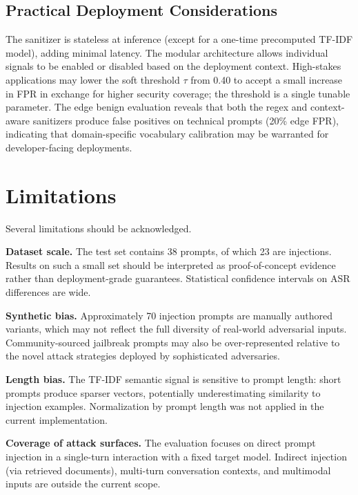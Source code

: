 \documentclass[10pt,conference]{IEEEtran}
\begin{document}
\subsection{Practical Deployment Considerations}

The sanitizer is stateless at inference (except for a one-time
precomputed TF-IDF model), adding minimal latency.
The modular architecture allows individual signals to be enabled or
disabled based on the deployment context.
High-stakes applications may lower the soft threshold $\tau$ from
0.40 to accept a small increase in FPR in exchange for higher
security coverage; the threshold is a single tunable parameter.
The edge benign evaluation reveals that both the regex and
context-aware sanitizers produce false positives on technical prompts
(20\% edge FPR), indicating that domain-specific vocabulary
calibration may be warranted for developer-facing deployments.

\section{Limitations}
\label{sec:limitations}

Several limitations should be acknowledged.

\textbf{Dataset scale.}
The test set contains 38 prompts, of which 23 are injections.
Results on such a small set should be interpreted as proof-of-concept
evidence rather than deployment-grade guarantees.
Statistical confidence intervals on ASR differences are wide.

\textbf{Synthetic bias.}
Approximately 70 injection prompts are manually authored variants,
which may not reflect the full diversity of real-world adversarial
inputs.
Community-sourced jailbreak prompts may also be over-represented
relative to the novel attack strategies deployed by sophisticated
adversaries.

\textbf{Length bias.}
The TF-IDF semantic signal is sensitive to prompt length: short
prompts produce sparser vectors, potentially underestimating
similarity to injection examples.
Normalization by prompt length was not applied in the current
implementation.

\textbf{Coverage of attack surfaces.}
The evaluation focuses on direct prompt injection in a
single-turn interaction with a fixed target model.
Indirect injection (via retrieved documents), multi-turn
conversation contexts, and multimodal inputs are outside the
current scope.
\end{document}
